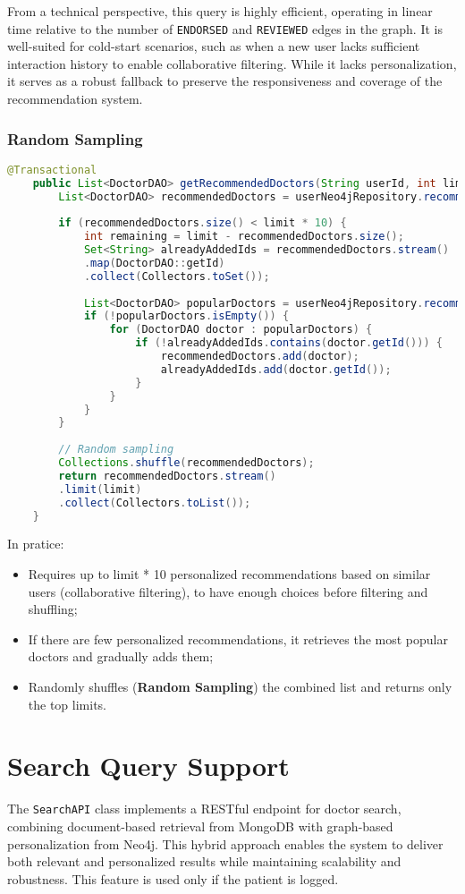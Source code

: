 From a technical perspective, this query is highly efficient, operating in linear time relative to the number of \texttt{ENDORSED} and \texttt{REVIEWED} edges in the graph. It is well-suited for cold-start scenarios, such as when a new user lacks sufficient interaction history to enable collaborative filtering. While it lacks personalization, it serves as a robust fallback to preserve the responsiveness and coverage of the recommendation system.

\subsubsection{Random Sampling}
\begin{lstlisting}[language=java]
	@Transactional
	public List<DoctorDAO> getRecommendedDoctors(String userId, int limit) {
		List<DoctorDAO> recommendedDoctors = userNeo4jRepository.recommendDoctorsForUser(userId, limit * 10);
		
		if (recommendedDoctors.size() < limit * 10) {
			int remaining = limit - recommendedDoctors.size();
			Set<String> alreadyAddedIds = recommendedDoctors.stream()
			.map(DoctorDAO::getId)
			.collect(Collectors.toSet());
			
			List<DoctorDAO> popularDoctors = userNeo4jRepository.recommendPopularDoctors(remaining * 2);
			if (!popularDoctors.isEmpty()) {
				for (DoctorDAO doctor : popularDoctors) {
					if (!alreadyAddedIds.contains(doctor.getId())) {
						recommendedDoctors.add(doctor);
						alreadyAddedIds.add(doctor.getId());
					}
				}
			}
		}
		
		// Random sampling
		Collections.shuffle(recommendedDoctors);
		return recommendedDoctors.stream()
		.limit(limit)
		.collect(Collectors.toList());
	}
\end{lstlisting}

In pratice:
\begin{itemize}
	\item Requires up to limit * 10 personalized recommendations based on similar users (collaborative filtering), to have enough choices before filtering and shuffling;
	\item If there are few personalized recommendations, it retrieves the most popular doctors and gradually adds them;
	\item Randomly shuffles (\textbf{Random Sampling}) the combined list and returns only the top limits.
\end{itemize}

\section{Search Query Support}
The \texttt{SearchAPI} class implements a RESTful endpoint for doctor search, combining document-based retrieval from MongoDB with graph-based personalization from Neo4j. This hybrid approach enables the system to deliver both relevant and personalized results while maintaining scalability and robustness. This feature is used only if the patient is logged. 

